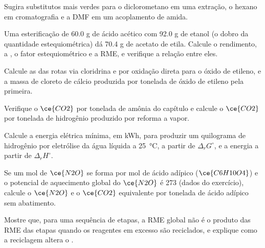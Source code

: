\begin{exercise}[$\star$]\label{exo:b3:green-industrial:4}
Sugira substitutos mais verdes para o diclorometano em uma extração, o hexano em
cromatografia e a DMF em um acoplamento de amida.
\end{exercise}

\begin{exercise}[$\star\star$]\label{exo:b3:green-industrial:5}
Uma esterificação de 60.0 g de ácido acético com 92.0 g de etanol (o dobro da
quantidade estequiométrica) dá 70.4 g de acetato de etila. Calcule o rendimento, a , o fator estequiométrico e a RME, e verifique a relação entre
eles.
\end{exercise}

\begin{exercise}[$\star\star$]\label{exo:b3:green-industrial:6}
Calcule as  das rotas via cloridrina e por oxidação direta para o
óxido de etileno, e a massa de cloreto de cálcio produzida por tonelada de óxido de etileno
pela primeira.
\end{exercise}

\begin{exercise}[$\star\star$]\label{exo:b3:green-industrial:7}
Verifique o $\ce{CO2}$ por tonelada de amônia do capítulo e calcule o $\ce{CO2}$ por tonelada de
hidrogênio produzido por reforma a vapor.
\end{exercise}

\begin{exercise}[$\star\star$]\label{exo:b3:green-industrial:8}
Calcule a energia elétrica mínima, em kWh, para produzir um quilograma de hidrogênio por
eletrólise da água líquida a \qty{25}{\celsius}, a partir de $\Delta_rG^\circ$, e a energia a partir de $\Delta_rH^\circ$.
\end{exercise}

\begin{exercise}[$\star\star$]\label{exo:b3:green-industrial:9}
Se um mol de $\ce{N2O}$ se forma por mol de ácido adípico ($\ce{C6H10O4}$) e o potencial de aquecimento
global do $\ce{N2O}$ é 273 (dados do exercício), calcule o $\ce{N2O}$ e o $\ce{CO2}$ equivalente
por tonelada de ácido adípico sem abatimento.
\end{exercise}

\begin{exercise}[$\star\star\star$]\label{exo:b3:green-industrial:10}
Mostre que, para uma sequência de etapas, a RME global não é o produto das RME das
etapas quando os reagentes em excesso são reciclados, e explique como a reciclagem altera o
.
\end{exercise}

